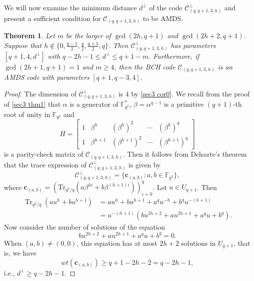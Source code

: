 \documentclass[10pt]{article}%
\newtheorem{theorem}{Theorem}%
\begin{document}
	We will now examine the minimum distance $d^\perp$ of the code $\mathcal{C}_{(q,q+1,3,h)}^\perp$ and present a sufficient condition for $\mathcal{C}_{(q,q+1,3,h)}$ to be AMDS.
	\begin{theorem}\label{sec3 thm4}
		Let $m$ be the larger of $\gcd(2h,q+1)$ and $\gcd(2h+2,q+1)$. Suppose that $h\notin\{0,\frac{q-1}{2},\frac{q}{2},\frac{q+1}{2},q\}$. Then $\mathcal{C}_{(q,q+1,3,h)}^\perp$ has parameters $[q+1,4,d^\perp]$ with $q-2h-1 \le d^\perp \le q+1-m$. Furthermore, if $\gcd(2h+1,q+1)=1$ and $m\ge4$, then the BCH code $\mathcal{C}_{(q,q+1,3,h)}$ is an AMDS code with parameters $[q+1,q-3,4]$.
	\end{theorem}
	\begin{proof}
		The dimension of $\mathcal{C}_{(q,q+1,3,h)}^\perp$ is $4$ by \cref{sec3 cor0}. We recall from the proof of \cref{sec3 thm1} that $\alpha$ is a generator of $\mathbb{F}_{q^2}^{\ast}$, $\beta=\alpha^{q-1}$ is a primitive $(q+1)$-th root of unity in $\mathbb{F}_{q^2}$ and
		\begin{equation*}
			\left.H=\left[\begin{array}{lllll}1&\beta^{h}&(\beta^{h})^2&\cdots&(\beta^{h})^q\\1&\beta^{h+1}&(\beta^{h+1})^2&\cdots&(\beta^{h+1})^q\end{array}\right.\right]
		\end{equation*}
		is a parity-check matrix of $\mathcal{C}_{(q,q+1,3,h)}$. Then it follows from Delsarte’s theorem that the trace expression of $\mathcal{C}_{(q,q+1,3,h)}^{\perp}$ is given by
		\begin{equation*}
			\mathcal{C}_{(q,q+1,3,h)}^\perp=\{\mathbf{c}_{(a,b)}:a,b\in\mathbb{F}_{q^2}\},
		\end{equation*}
		where $\mathbf{c}_{(a,b)}=\left(\mathrm{Tr}_{q^{2}/q}\left(a\beta^{hi}+b\beta^{(h+1)i}\right)\right)_{i=0}^{q}.$ Let $u \in U_{q+1}$. Then 
		\begin{equation}
			\label{sec3 thm4 equ1}
			\begin{aligned}
				\operatorname{Tr}_{q^2/q}(au^h+bu^{h+1})&=au^h+bu^{h+1}+a^qu^{-h}+b^qu^{-(h+1)}\\&=u^{-(h+1)}(bu^{2h+2}+au^{2h+1}+a^qu+b^q).
			\end{aligned}
		\end{equation}
		Now consider the number of solutions of the equation
		\begin{equation}
			\label{sec3 thm4 equ2}
			bu^{2h+2}+au^{2h+1}+a^qu+b^q=0.
		\end{equation}
		When $(a,b) \ne (0,0)$, this equation has at most $2h+2$ solutions in $U_{q+1}$, that is, we have
		\begin{equation*}
			wt(\mathbf{c}_{(a,b)})\geq q+1-2h-2=q-2h-1, 
		\end{equation*}
		i.e., $d^\perp \ge q-2h-1$.
		

\end{proof}
\end{document}
